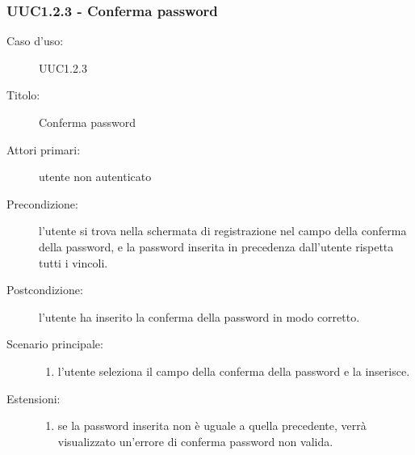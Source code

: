 \documentclass[casi-duso]{subfiles}
\begin{document}
\subsubsection{UUC1.2.3 - Conferma password}%
\label{subsub:UUC1.2.3utente}
\begin{description}
  \item[Caso d’uso:] UUC1.2.3
  \item[Titolo:] Conferma password
  \item[Attori primari:] utente non autenticato
  \item[Precondizione:] l'utente si trova nella schermata di registrazione nel campo della conferma della password,
        e la password inserita in precedenza dall'utente rispetta tutti i vincoli.
  \item[Postcondizione:] l'utente ha inserito la conferma della password in modo corretto.
  \item[Scenario principale:]
        \begin{enumerate}
          \item l'utente seleziona il campo della conferma della password e la inserisce.
        \end{enumerate}
  \item[Estensioni:]
        \begin{enumerate}
          \item se la password inserita non è uguale a quella precedente, verrà visualizzato un'errore di conferma password non valida.
        \end{enumerate}
\end{description}

\end{document}
